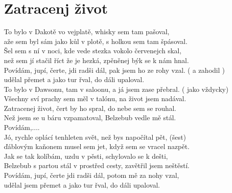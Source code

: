 \section{Zatracenj život}
\onehalfspacing

To bylo v Dakotě vo vejplatě,  whisky sem tam pašoval,\\
aže sem byl sám jako kůl v plotě, s holkou sem tam špásoval.\\
Šel sem s ní v noci, kde vede stezka vokolo červenejch skal,\\
než sem jí stačil říct že je hezká, zpěněnej býk se k nám hnal.\\

Povídám,  jupí, čerte, jdi radši dál, pak jsem ho ze rohy vzal. ( a zahodil )\\
udělal přemet a jako tur řval, do dáli upaloval.\\

To bylo v Dawsonu, tam v saloonu, a já jsem zase přebral. ( jako vždycky)\\
Všechny sví prachy sem měl v talónu, na život jsem nadával.\\
Zatracenej život, čert by ho spral, do nebe sem se rouhal.\\
Než jsem se u báru vzpamatoval, Belzebub vedle mě stál.\\

Povídám,....\\

Jó, rychle oplácí tenhleten svět, než bys napočítal pět, (šest)\\
ďáblovým kaňonem musel sem jet, když sem se vracel nazpět.\\
Jak se tak kolíbám, uzdu v pěsti, schylovalo se k dešti,\\
Belzebub s partou stál v prostřed cesty, zavětřil jsem neštěstí.\\

Povídám, jupí, čerte jdi radši dál, potom mě za nohy vzal,\\
udělal jsem přemet a jako tur řval, do dáli upaloval.\\
